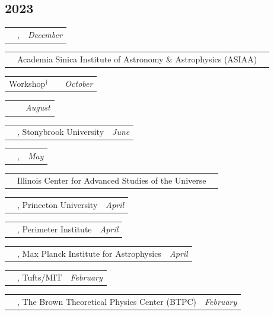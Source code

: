 \documentclass[10pt,a4paper, roman]{moderncv}
\makeatletter
\renewcommand*{\cvitemwithcomment}[3]{%
\parbox{\textwidth}{%
\begin{tabularx}{\textwidth}{@{} p{1.0in} X r @{}} #1 & #2 & \textit{#3} \end{tabularx}%
}%
}
\newcommand{\chref}[3][mutedblue]{\href{#2}{\color{#1}{#3}}}
\newcommand{\chrefccs}[2]{\chref[mutedred]{https://cyril-creque.github.io/files/#1}{#2}}
\makeatother
\begin{document}
\subsection{2023}
\cvitemwithcomment{\chrefccs{talks/TaiwanPVT.pdf}{Workshop*}}{\chref[mutedblue]{https://events.asiaa.sinica.edu.tw/workshop/20231204/}{Large-Scale Parity Violation Workshop}, }{December}
\cvitemwithcomment{}{Academia Sinica Institute of Astronomy \& Astrophysics (ASIAA)}{}
\cvitemwithcomment{Workshop$^\dagger$}{\chref[mutedblue]{https://inspirehep.net/conferences/2690282}{Parity Violation from Home}}{October}
\cvitemwithcomment{\chrefccs{talks/Cosmology_Talks.pdf}{Talk*}}{\chref[mutedblue]{https://www.youtube.com/watch?v=IxhbpfblhQQ}{Cosmology Talks}}{August}
\cvitemwithcomment{\chrefccs{talks/EoIHBBStonyBrook.pdf}{Workshop*}}{\chref[mutedblue]{https://scgp.stonybrook.edu/archives/37154}{Ending Inflation \& the Hot Big Bang}, Stonybrook University}{June}
\cvitemwithcomment{\chrefccs{talks/4PTdCS-ModifiedGravity.pdf}{Workshop*}}{\chref[mutedblue]{https://icasu.illinois.edu/modified-gravity/program}{Modified Gravity Program}, }{May}
\cvitemwithcomment{}{Illinois Center for Advanced Studies of the Universe}{}
\cvitemwithcomment{\chrefccs{talks/4PTdCS-FFPS.pdf}{Symposium*}}{\chref[mutedblue]{https://futurefaculty.princeton.edu/events/2023/future-faculty-symposium-physics}{Future Faculty Symposium in Physics}, Princeton University}{April} 
\cvitemwithcomment{\chrefccs{talks/4PTdCS-Perimeter.pdf}{Seminar*}}{\chref[mutedblue]{https://perimeterinstitute.ca/events/parity-violation-gravity-new-constructions-and-inflationary-signals}{Quantum Gravity Seminar}, Perimeter Institute}{April}
\cvitemwithcomment{\chrefccs{talks/MPA4PT.pdf}{Seminar*}}{\chref[mutedblue]{https://wwwmpa.mpa-garching.mpg.de/cosmo_seminars/}{Cosmology Seminar}, Max Planck Institute for Astrophysics}{April}
\cvitemwithcomment{\chrefccs{talks/Tufts+MITCosmo2023.pdf}{Seminar*}}{\chref[mutedblue]{https://cosmos.phy.tufts.edu/joint-seminar/Spring-2023/}{Cosmology Seminar}, Tufts/MIT}{February}
\cvitemwithcomment{\chrefccs{talks/4PT_dCS.pdf}{Seminar*}}{\chref[mutedblue]{https://events.brown.edu/event/251678-btpc-idea-seminar-featuring-cyril}{IDEA Seminar}, The Brown Theoretical Physics Center (BTPC)}{February}
\end{document}
